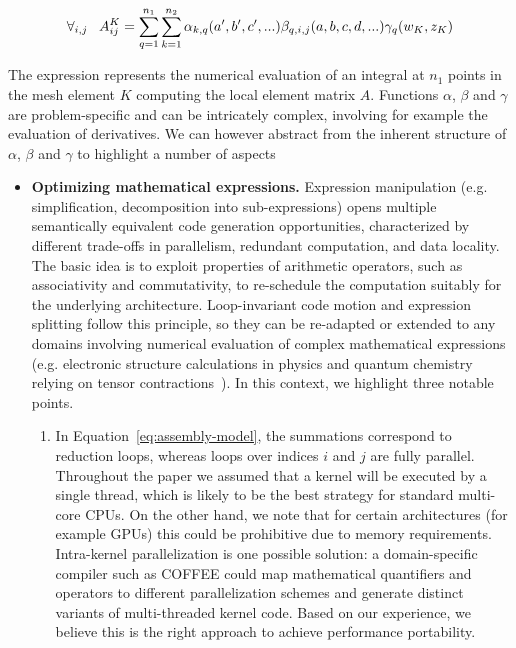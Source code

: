 \begin{equation}
\label{eq:assembly-model}
\scriptsize
\forall_{i, j} ~~~ A_{ij}^K = \sum_{q=1}^{n_1} \sum_{k=1}^{n_2} \alpha_{k, q}(a', b', c', ...) \beta_{q, i, j}(a, b, c, d, ...) \gamma_{q}(w_K, z_K)
\end{equation}

The expression represents the numerical evaluation of an integral at $n_1$ points in the mesh element $K$ computing the local element matrix $A$. Functions $\alpha$, $\beta$ and $\gamma$ are problem-specific and can be intricately complex, involving for example the evaluation of derivatives. We can however abstract from the inherent structure of $\alpha$, $\beta$ and $\gamma$ to highlight a number of aspects

\begin{itemize}
\item \textbf{Optimizing mathematical expressions.} Expression manipulation (e.g. simplification, decomposition into sub-expressions) opens multiple semantically equivalent code generation opportunities, characterized by different trade-offs in parallelism, redundant computation, and data locality. The basic idea is to exploit properties of arithmetic operators, such as associativity and commutativity, to re-schedule the computation suitably for the underlying architecture. Loop-invariant code motion and expression splitting follow this principle, so they can be re-adapted or extended to any domains involving numerical evaluation of complex mathematical expressions (e.g. electronic structure calculations in physics and quantum chemistry relying on tensor contractions~\cite{TCE}). In this context, we highlight three notable points.
\begin{enumerate}
\item In Equation~\eqref{eq:assembly-model}, the summations correspond to reduction loops, whereas loops over indices $i$ and $j$ are fully parallel. Throughout the paper we assumed that a kernel will be executed by a single thread, which is likely to be the best strategy for standard multi-core CPUs. On the other hand, we note that for certain architectures (for example GPUs) this could be prohibitive due to memory requirements. Intra-kernel parallelization is one possible solution: a domain-specific compiler such as COFFEE could map mathematical quantifiers and operators to different parallelization schemes and generate distinct variants of multi-threaded kernel code. Based on our experience, we believe this is the right approach to achieve performance portability.

\end{enumerate}
\end{itemize}
